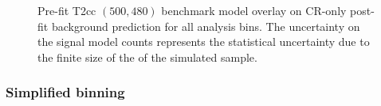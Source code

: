 \begin{figure}[!h]
{        \label{fig:T2cc_compressed_MR_4j}
    } \\
     ~~
     \\
    \caption{
        Pre-fit T2cc $(500,480)$ benchmark model overlay on CR-only post-fit
        background prediction for all analysis bins. The uncertainty on the
        signal model counts represents the statistical uncertainty due to the
        finite size of the of the simulated sample.
    }
    \label{fig:T2cc_compressed_MR}
\end{figure}


\clearpage
\subsubsection{Simplified binning}


